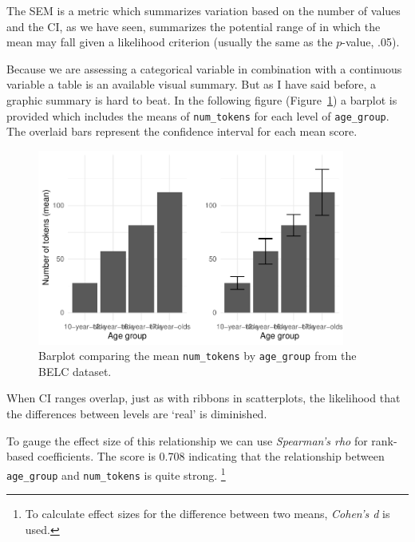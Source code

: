 \documentclass[
  letterpaper,
]{latex/krantz}
\begin{document}
The SEM is a metric which summarizes variation based on the number of
values and the CI, as we have seen, summarizes the potential range of in
which the mean may fall given a likelihood criterion (usually the same
as the \(p\)-value, .05).

Because we are assessing a categorical variable in combination with a
continuous variable a table is an available visual summary. But as I
have said before, a graphic summary is hard to beat. In the following
figure (Figure~\ref{fig-summaries-bivariate-barplot-belc}) a barplot is
provided which includes the means of \texttt{num\_tokens} for each level
of \texttt{age\_group}. The overlaid bars represent the confidence
interval for each mean score.

\begin{figure}

{\centering \includegraphics[width=0.9\textwidth,height=\textheight]{./approaching-analysis_files/figure-pdf/fig-summaries-bivariate-barplot-belc-1.pdf}

}

\caption{\label{fig-summaries-bivariate-barplot-belc}Barplot comparing
the mean \texttt{num\_tokens} by \texttt{age\_group} from the BELC
dataset.}

\end{figure}

When CI ranges overlap, just as with ribbons in scatterplots, the
likelihood that the differences between levels are `real' is diminished.

To gauge the effect size of this relationship we can use
\emph{Spearman's rho} for rank-based coefficients. The score is 0.708
indicating that the relationship between \texttt{age\_group} and
\texttt{num\_tokens} is quite strong. \footnote{To calculate effect
  sizes for the difference between two means, \emph{Cohen's d} is used.}
\end{document}
